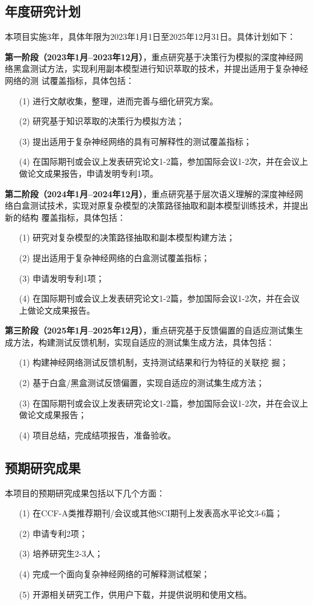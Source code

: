 \subsection{年度研究计划}
本项目实施3年，具体年限为2023年1月1日至2025年12月31日。具体计划如下：

\textbf{第一阶段（2023年1月--2023年12月）}，重点研究基于决策行为模拟的深度神经网
络黑盒测试方法，实现利用副本模型进行知识萃取的技术，并提出适用于复杂神经网络的测
试覆盖指标，具体包括：
\begin{itemize}[itemindent=2em]
    \item[(1)] 进行文献收集，整理，进而完善与细化研究方案。
    \item[(2)] 研究基于知识萃取的决策行为模拟方法；
    \item[(3)] 提出适用于复杂神经网络的具有可解释性的测试覆盖指标；
    \item[(4)] 在国际期刊或会议上发表研究论文1-2篇，参加国际会议1-2次，并在会议上
          做论文成果报告，申请发明专利1项。
\end{itemize}

\textbf{第二阶段（2024年1月--2024年12月）}，重点研究基于层次语义理解的深度神经网
络白盒测试技术，实现对原复杂模型的决策路径抽取和副本模型训练技术，并提出新的结构
覆盖指标，具体包括：
\begin{itemize}[itemindent=2em]
    \item[(1)] 研究对复杂模型的决策路径抽取和副本模型构建方法；
    \item[(2)] 提出适用于复杂神经网络的白盒测试覆盖指标；
    \item[(3)] 申请发明专利1项；
    \item[(4)] 在国际期刊或会议上发表研究论文1-2篇，参加国际会议1-2次，并在会议
          上做论文成果报告。
\end{itemize}

\textbf{第三阶段（2025年1月--2025年12月）}，重点研究基于反馈偏置的自适应测试集生
成方法，构建测试反馈机制，实现自适应的测试集生成方法，具体包括：
\begin{itemize}[itemindent=2em]
    \item[(1)] 构建神经网络测试反馈机制，支持测试结果和行为特征的关联挖
          掘；
    \item[(2)] 基于白盒/黑盒测试反馈偏置，实现自适应的测试集生成方法；
    \item[(3)] 在国际期刊或会议上发表研究论文1-2篇，参加国际会议1-2次，并在会议上
          做论文成果报告；
    \item[(4)] 项目总结，完成结项报告，准备验收。
\end{itemize}

\subsection{预期研究成果}

本项目的预期研究成果包括以下几个方面：
\begin{itemize}[itemindent=2em]
    \item[(1)] 在CCF-A类推荐期刊/会议或其他SCI期刊上发表高水平论文3-6篇；
    \item[(2)] 申请专利2项；
    \item[(3)] 培养研究生2-3人；
    \item[(4)] 完成一个面向复杂神经网络的可解释测试框架；
    \item[(5)] 开源相关研究工作，供用户下载，并提供说明和使用文档。
\end{itemize}

